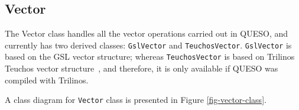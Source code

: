 \begin{table}[htpb]
\begin{center}
\begin{tabular}{l c  m{7cm}}
%
\bottomrule
\end{tabular}
\end{center}
\end{table}

  

\subsection{Vector}\label{sec:vector_class}


The Vector class handles all the vector operations carried out in QUESO, and currently has two derived classes: \verb+GslVector+ and \verb+TeuchosVector+. \verb+GslVector+ is based on the GSL vector structure; whereas \verb+TeuchosVector+ is based on Trilinos Teuchos vector structure~\cite{Trilinos}, and therefore, it is only available if QUESO was compiled with Trilinos.  

A class diagram for \verb+Vector+ class is presented in Figure \ref{fig-vector-class}.%


